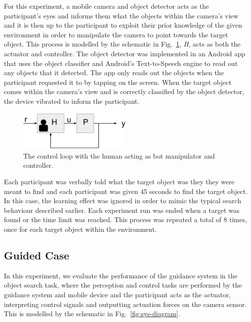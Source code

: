 \documentclass[runningheads]{llncs}
\begin{document}
For this experiment, a mobile camera and object detector acts as the participant's eyes and informs them what the objects within the camera's view and it is then up to the participant to exploit their prior knowledge of the given environment in order to manipulate the camera to point towards the target object. 
This process is modelled by the schematic in Fig.~\ref{fig:sys-diagram-no-controller}, \emph{H}, acts as both the actuator and controller.
The object detector was implemented in an Android app that uses the object classifier and Android's Text-to-Speech engine to read out any objects that it detected. 
The app only reads out the objects when the participant requested it to by tapping on the screen. 
When the target object comes within the camera's view and is correctly classified by the object detector, the device vibrated to inform the participant. 

\begin{figure}
  \centering
  \includegraphics[width=0.5\textwidth]{figures/control_loop_no_controller.png}
  \caption{The control loop with the human acting as bot manipulator and controller. }\label{fig:sys-diagram-no-controller}
\end{figure}

Each participant was verbally told what the target object was they they were meant to find and each participant was given 45 seconds to find the target object. 
In this case, the learning effect was ignored in order to mimic the typical search behaviour described earlier. 
Each experiment run was ended when a target was found or the time limit was reached. 
This process was repeated a total of 8 times, once for each target object within the environment. 

\subsection{Guided Case}

In this experiment, we evaluate the performance of the guidance system in the object search task, where the perception and control tasks are performed by the guidance system and mobile device and the participant acts as the actuator, interpreting control signals and outputting actuation forces on the camera sensor. 
This is modelled by the schematic in Fig.~\ref{fig:sys-diagram}. 
\end{document}
